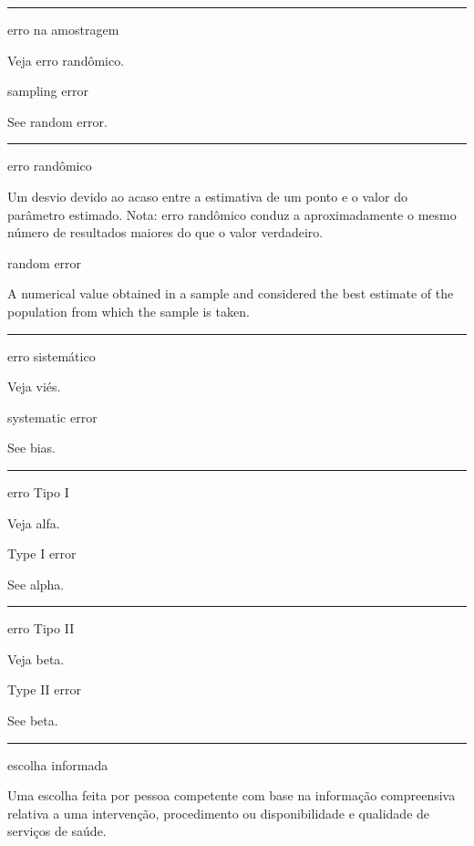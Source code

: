 \documentclass[
  openany]{book}
\begin{document}
\begin{center}\rule{0.5\linewidth}{0.5pt}\end{center}

erro na amostragem

Veja erro randômico.

sampling error

See random error.

\begin{center}\rule{0.5\linewidth}{0.5pt}\end{center}

erro randômico

Um desvio devido ao acaso entre a estimativa de um ponto e o valor do parâmetro estimado. Nota: erro randômico conduz a aproximadamente o mesmo número de resultados maiores do que o valor verdadeiro.

random error

A numerical value obtained in a sample and considered the best estimate of the population from which the sample is taken.

\begin{center}\rule{0.5\linewidth}{0.5pt}\end{center}

erro sistemático

Veja viés.

systematic error

See bias.

\begin{center}\rule{0.5\linewidth}{0.5pt}\end{center}

erro Tipo I

Veja alfa.

Type I error

See alpha.

\begin{center}\rule{0.5\linewidth}{0.5pt}\end{center}

erro Tipo II

Veja beta.

Type II error

See beta.

\begin{center}\rule{0.5\linewidth}{0.5pt}\end{center}

escolha informada

Uma escolha feita por pessoa competente com base na informação compreensiva relativa a uma intervenção, procedimento ou disponibilidade e qualidade de serviços de saúde.
\end{document}
